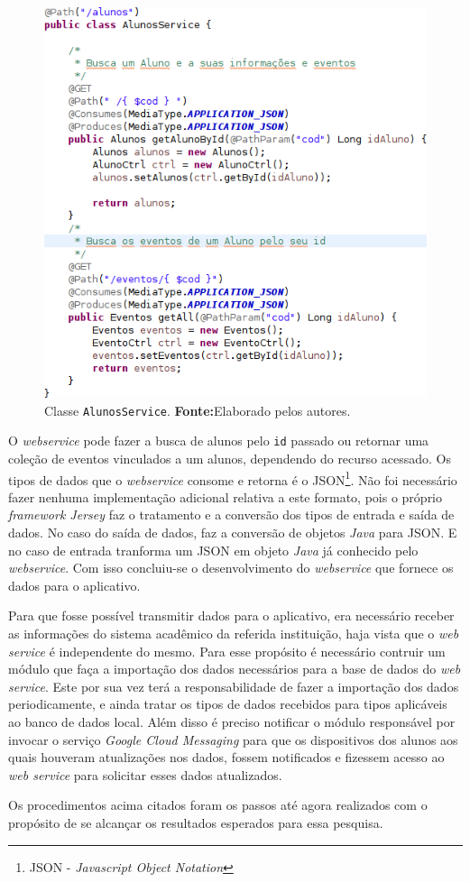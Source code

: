 		\begin{figure}[h!]
			\centerline{\includegraphics[scale=0.7]{./imagens/2_q_metodologico/qm13.png}}
			\caption[Classe \texttt{AlunosService}]{Classe \texttt{AlunosService}.
			\textbf{Fonte:}Elaborado pelos autores.}
			\label{fig:qm13}
		\end{figure}
		
		\par O \textit{webservice} pode fazer a busca de alunos pelo \texttt{id}
passado ou retornar uma coleção de eventos vinculados a um alunos, dependendo
do recurso acessado. Os tipos de dados que o \textit{webservice} consome e
retorna é o JSON\footnote{JSON - \textit{Javascript Object Notation}}. Não foi
necessário fazer nenhuma implementação adicional relativa a este formato, pois
o próprio \textit{framework Jersey} faz o tratamento e a conversão dos tipos de
entrada e saída de dados. No caso do saída de dados, faz a conversão de objetos 
\textit{Java} para JSON. E no caso de entrada tranforma um JSON em objeto
\textit{Java} já conhecido pelo \textit{webservice}. Com isso concluiu-se o
desenvolvimento do \textit{webservice} que fornece os dados para o aplicativo.

	\par Para que fosse possível transmitir dados para o aplicativo, era
necessário receber as informações do sistema acadêmico da referida instituição,
haja vista que o \textit{web service} é independente do mesmo. Para esse
propósito é necessário  contruir um módulo que faça a importação dos dados
necessários para a base de dados do \textit{web service}. Este por sua vez
terá a responsabilidade de fazer a importação dos dados periodicamente, e
ainda tratar os tipos de dados recebidos para tipos aplicáveis ao banco de
dados local. Além disso é preciso notificar o módulo responsável por invocar
o serviço \textit{Google Cloud Messaging} para que os dispositivos dos alunos
aos quais houveram atualizações nos dados, fossem notificados e fizessem acesso
ao \textit{web service} para solicitar esses dados atualizados.

	\par Os procedimentos acima citados foram os passos até agora realizados com o
propósito de se alcançar os resultados esperados para essa pesquisa.